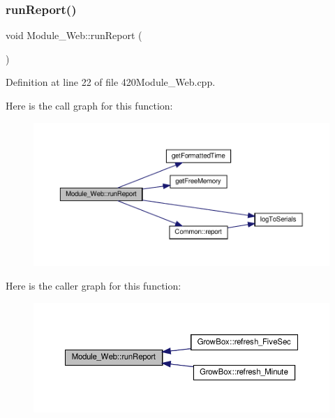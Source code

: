 \mbox{\label{class_module___web_a32622fc4e87a9885319c73c5b4802cc5}} 
\subsubsection{\texorpdfstring{run\+Report()}{runReport()}\hspace{0.1cm}{\footnotesize\ttfamily [2/2]}}
{\footnotesize\ttfamily void Module\+\_\+\+Web\+::run\+Report (\begin{DoxyParamCaption}{ }\end{DoxyParamCaption})}



Definition at line 22 of file 420\+Module\+\_\+\+Web.\+cpp.

Here is the call graph for this function\+:
\nopagebreak
\begin{figure}[H]
\begin{center}
\leavevmode
\includegraphics[width=350pt]{class_module___web_a32622fc4e87a9885319c73c5b4802cc5_cgraph}
\end{center}
\end{figure}
Here is the caller graph for this function\+:
\nopagebreak
\begin{figure}[H]
\begin{center}
\leavevmode
\includegraphics[width=350pt]{class_module___web_a32622fc4e87a9885319c73c5b4802cc5_icgraph}
\end{center}
\end{figure}
\mbox{\label{class_module___web_adec2319a465bb9478e3699ce2d9612db}} 
